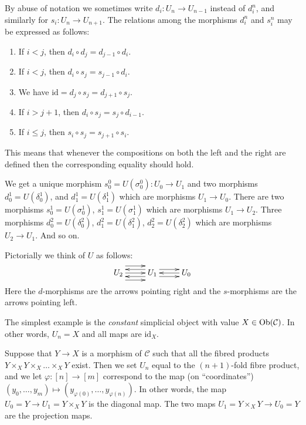 \begin{remark}
\label{remark-relations}
By abuse of notation we sometimes write $d_i : U_n \to U_{n - 1}$
instead of $d^n_i$, and similarly for $s_i : U_n \to U_{n + 1}$.
The relations among the morphisms $d^n_i$ and $s^n_i$
may be expressed as follows:
\begin{enumerate}
\item If $i < j$, then $d_i \circ d_j = d_{j - 1} \circ d_i$.
\item If $i < j$, then $d_i \circ s_j = s_{j - 1} \circ d_i$.
\item We have $\text{id} = d_j \circ s_j = d_{j + 1} \circ s_j$.
\item If $i > j + 1$, then $d_i \circ s_j = s_j \circ d_{i - 1}$.
\item If $i \leq j$, then $s_i \circ s_j = s_{j + 1} \circ s_i$.
\end{enumerate}
This means that whenever the compositions on both the left and the
right are defined then the corresponding equality should hold.
\end{remark}

\noindent
We get a unique morphism $s^0_0 = U(\sigma^0_0) : U_0 \to U_1$ and
two morphisms $d^1_0 = U(\delta^1_0)$, and
$d^1_1 = U(\delta^1_1)$ which are morphisms $U_1 \to U_0$.
There are two morphisms $s^1_0 = U(\sigma^1_0)$, $s^1_1 = U(\sigma^1_1)$
which are morphisms $U_1 \to U_2$. Three morphisms
$d^2_0 = U(\delta^2_0)$, $d^2_1 = U(\delta^2_1)$, $d^2_2 = U(\delta^2_2)$
which are morphisms $U_2 \to U_1$. And so on.

\medskip\noindent
Pictorially we think of $U$ as follows:
$$
\xymatrix{
U_2
\ar@<2ex>[r]
\ar@<0ex>[r]
\ar@<-2ex>[r]
&
U_1
\ar@<1ex>[r]
\ar@<-1ex>[r]
\ar@<1ex>[l]
\ar@<-1ex>[l]
&
U_0
\ar@<0ex>[l]
}
$$
Here the $d$-morphisms are the arrows pointing right and the
$s$-morphisms are the arrows pointing left.

\begin{example}
\label{example-constant-simplicial-object}
The simplest example is the {\it constant} simplicial object with
value $X \in \mathop{\mathrm{Ob}}\nolimits(\mathcal{C})$. In other words, $U_n = X$ and
all maps are $\text{id}_X$.
\end{example}

\begin{example}
\label{example-fibre-products-simplicial-object}
Suppose that $Y\to X$ is a morphism of $\mathcal{C}$ such that all
the fibred products $Y \times_X Y \times_X \ldots \times_X Y$ exist.
Then we set $U_n$ equal to the $(n + 1)$-fold fibre product,
and we let $\varphi : [n] \to [m]$ correspond to the map
(on ``coordinates'')
$(y_0, \ldots, y_m) \mapsto (y_{\varphi(0)}, \ldots, y_{\varphi(n)})$.
In other words, the map $U_0 = Y \to U_1 = Y \times_X Y$ is the
diagonal map. The two maps $U_1 = Y \times_X Y \to U_0 = Y$ are the
projection maps.
\end{example}

